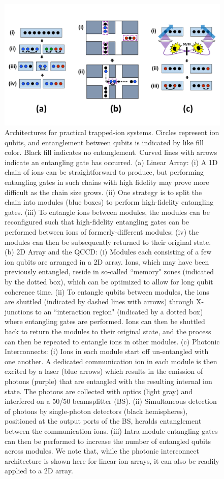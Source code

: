 \documentclass[%
12pt,
 amsmath,amssymb,
]{revtex4-2}
\begin{document}
\begin{figure}[tp]
\includegraphics[width=0.9\columnwidth]{Architecture_LinearArray_v7.pdf}
\caption{Architectures for practical trapped-ion systems.  Circles represent ion qubits, and entanglement between qubits is indicated by like fill color.  Black fill indicates no entanglement.  Curved lines with arrows indicate an entangling gate has occurred.  (a) Linear Array: (i) A 1D chain of ions can be straightforward to produce, but performing entangling gates in such chains with high fidelity may prove more difficult as the chain size grows. (ii) One strategy is to split the chain into modules (blue boxes) to perform high-fidelity entangling gates. (iii) To entangle ions between modules, the modules can be reconfigured such that high-fidelity entangling gates can be performed between ions of formerly-different modules; (iv) the modules can then be subsequently returned to their original state.  (b) 2D Array and the QCCD: (i) Modules each consisting of a few ion qubits are arranged in a 2D array.  Ions, which may have been previously entangled, reside in so-called ``memory" zones (indicated by the dotted box), which can be optimized to allow for long qubit coherence time. (ii) To entangle qubits between modules, the ions are shuttled (indicated by dashed lines with arrows) through X-junctions to an ``interaction region" (indicated by a dotted box) where entangling gates are performed. Ions can then be shuttled back to return the modules to their original state, and the process can then be repeated to entangle ions in other modules.  (c) Photonic Interconnects: (i) Ions in each module start off un-entangled with one another.  A dedicated communication ion in each module is then excited by a laser (blue arrows) which results in the emission of photons (purple) that are entangled with the resulting internal ion state.  The photons are collected with optics (light gray) and interfered on a 50/50 beamsplitter (BS).  (ii) Simultaneous detection of photons by single-photon detectors (black hemispheres), positioned at the output ports of the BS, heralds entanglement between the communication ions. (iii) Intra-module entangling gates can then be performed to increase the number of entangled qubits across modules.  We note that, while the photonic interconnect architecture is shown here for linear ion arrays, it can also be readily applied to a 2D array.}
\label{fig:architectures}
\end{figure}
\end{document}
